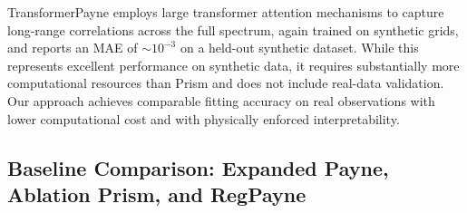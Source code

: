 \documentclass[preprint]{aastex701-1/aastex701}
\begin{document}
TransformerPayne \citep{TransformerPayne2025} employs large transformer attention
mechanisms to capture long-range correlations across the full spectrum, again trained on
synthetic grids, and reports an MAE of $\sim 10^{-3}$ on a held-out synthetic dataset.
While this represents excellent performance on synthetic data, it requires substantially
more computational resources than Prism and does not include real-data validation.
Our approach achieves comparable fitting accuracy on real observations with lower
computational cost and with physically enforced interpretability.

\subsection{Baseline Comparison: Expanded Payne, Ablation Prism, and RegPayne}
\label{sec:baselines_note}
\label{subsec:baselines}
\end{document}
